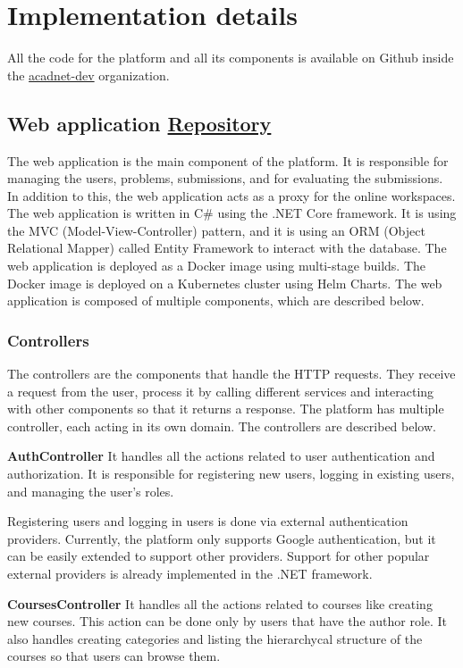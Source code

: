 \documentclass[12pt,a4paper]{report}
\begin{document}
\chapter{Implementation details}
All the code for the platform and all its components is available on Github inside the \href{https://github.com/acadnet-dev}{acadnet-dev} organization.

\section{Web application \href{https://github.com/acadnet-dev/web}{ Repository}}
The web application is the main component of the platform. It is responsible for managing the users, problems, submissions, and for evaluating the submissions. In addition to this, the web application acts as a proxy for the online workspaces. The web application is written in C\# using the .NET Core framework. It is using the MVC (Model-View-Controller) pattern, and it is using an ORM (Object Relational Mapper) called Entity Framework to interact with the database. The web application is deployed as a Docker image using multi-stage builds. The Docker image is deployed on a Kubernetes cluster using Helm Charts. The web application is composed of multiple components, which are described below.

\subsection{Controllers}
The controllers are the components that handle the HTTP requests. They receive a request from the user, process it by calling different services and interacting with other components so that it returns a response. The platform has multiple controller, each acting in its own domain. The controllers are described below.

\textbf{AuthController}
It handles all the actions related to user authentication and authorization. It is responsible for registering new users, logging in existing users, and managing the user's roles.

Registering users and logging in users is done via external authentication providers. Currently, the platform only supports Google authentication, but it can be easily extended to support other providers. Support for other popular external providers is already implemented in the .NET framework.

\textbf{CoursesController}
It handles all the actions related to courses like creating new courses. This action can be done only by users that have the author role. It also handles creating categories and listing the hierarchycal structure of the courses so that users can browse them.
\end{document}
